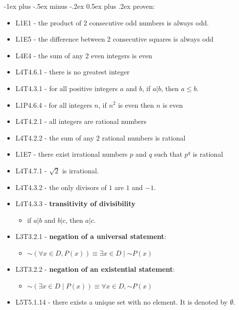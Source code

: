 \documentclass[10pt, landscape]{article}
\makeatletter
\renewcommand{\section}{\@startsection{section}{1}{0mm}%
                                {-1ex plus -.5ex minus -.2ex}%
                                {0.5ex plus .2ex}%
                                {\normalfont\large\bfseries}}
\renewcommand{\lnot}{\mathord{\sim}}
\renewcommand{\bf}[1]{\textbf{#1}}
\makeatother
\begin{document}
\begin{multicols*}{3}
    \section{proven:}
    \begin{itemize}
        \item L1E1 - the product of 2 consecutive odd numbers is always odd.
        \item L1E5 - the difference between 2 consecutive squares is always odd
        \item L4E4 - the sum of any 2 even integers is even
        \item L4T4.6.1 - there is no greatest integer
        \item L4T4.3.1 - for all positive integers $a$ and $b$, if $a \vert b$, then $a \leq b$.
        \item L1P4.6.4 - for all integers $n$, if $n^2$ is even then $n$ is even
        \item L4T4.2.1 - all integers are rational numbers
        \item L4T4.2.2 - the sum of any 2 rational numbers is rational
        \item L1E7 - there exist irrational numbers $p$ and $q$ such that $p^q$ is rational
        \item L4T4.7.1 - $\sqrt{2}$ is irrational.
        \item L4T4.3.2 - the only divisors of $1$ are $1$ and $-1$.
        \item L4T4.3.3 - \bf{transitivity of divisibility} 
        \begin{itemize}
            \item if $a\vert b$ and $b \vert c$, then $a \vert c$.
        \end{itemize}
        \item L3T3.2.1 - \bf{negation of a universal statement}: 
        \begin{itemize}
            \item $\lnot (\forall x \in D, P(x)) \equiv \exists x \in D \mid \lnot P(x)$
        \end{itemize}
        \item L3T3.2.2 - \bf{negation of an existential statement}: 
        \begin{itemize}
            \item $\lnot (\exists x \in D \mid P(x)) \equiv \forall x \in D, \lnot P(x)$
        \end{itemize}
        \item L5T5.1.14 - there exists a unique set with no element. It is denoted by $\emptyset$.

\end{itemize}
\end{multicols*}
\end{document}

